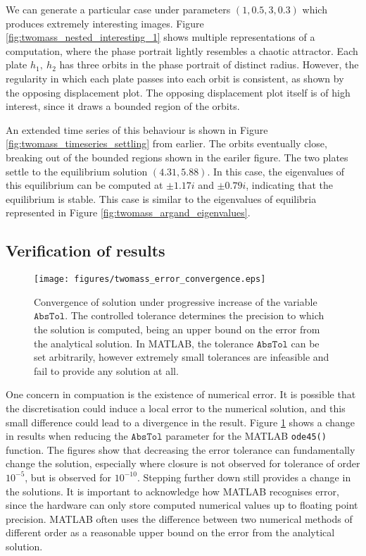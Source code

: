 \documentclass{article}
\begin{document}

We can generate a particular case under parameters \((1,0.5,3,0.3)\) which produces extremely interesting images.
Figure \ref{fig:twomass_nested_interesting_1} shows multiple representations of a computation,
where the phase portrait lightly resembles a chaotic attractor.
Each plate $h_1,~h_2$ has three orbits in the phase portrait of distinct radius.
However, the regularity in which each plate passes into each orbit is consistent,
as shown by the opposing displacement plot.
The opposing displacement plot itself is of high interest,
since it draws a bounded region of the orbits.

An extended time series of this behaviour is shown in Figure \ref{fig:twomass_timeseries_settling} from earlier.
The orbits eventually close, breaking out of the bounded regions shown in the eariler figure.
The two plates settle to the equilibrium solution \((4.31,5.88)\).
In this case, the eigenvalues of this equilibrium can be computed at $\pm 1.17i$ and $\pm 0.79i$,
indicating that the equilibrium is stable.
This case is similar to the eigenvalues of equilibria represented in Figure \ref{fig:twomass_argand_eigenvalues}.


\subsection{Verification of results}

\begin{figure}
    \centering
    \texttt{[image: figures/twomass\_error\_convergence.eps]}
    \caption{
        Convergence of solution under progressive increase of the variable $\mathtt{AbsTol}$.
        The controlled tolerance determines the precision to which the solution is computed,
        being an upper bound on the error from the analytical solution.
        In MATLAB, the tolerance $\mathtt{AbsTol}$ can be set arbitrarily,
        however extremely small tolerances are infeasible and fail to provide any solution at all.
    }
    \label{fig:twomass_stepping_tolerance}
\end{figure}

One concern in compuation is the existence of numerical error.
It is possible that the discretisation could induce a local error to the numerical solution,
and this small difference could lead to a divergence in the result.
Figure \ref{fig:twomass_stepping_tolerance} shows a change in results when reducing the $\mathtt{AbsTol}$ parameter for the MATLAB \texttt{ode45()} function.
The figures show that decreasing the error tolerance can fundamentally change the solution,
especially where closure is not observed for tolerance of order $10^{-5}$,
but is observed for $10^{-10}$.
Stepping further down still provides a change in the solutions.
It is important to acknowledge how MATLAB recognises error,
since the hardware can only store computed numerical values up to floating point precision.
MATLAB often uses the difference between two numerical methods of different order as a reasonable upper bound on the error from the analytical solution.
\end{document}
